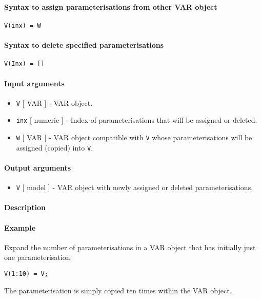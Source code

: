 


	\paragraph{Syntax to assign parameterisations from other VAR
object}\label{syntax-to-assign-parameterisations-from-other-var-object}

\begin{verbatim}
V(inx) = W
\end{verbatim}

\paragraph{Syntax to delete specified
parameterisations}\label{syntax-to-delete-specified-parameterisations}

\begin{verbatim}
V(Inx) = []
\end{verbatim}

\paragraph{Input arguments}\label{input-arguments}

\begin{itemize}
\item
  \texttt{V} {[} VAR {]} - VAR object.
\item
  \texttt{inx} {[} numeric {]} - Index of parameterisations that will be
  assigned or deleted.
\item
  \texttt{W} {[} VAR {]} - VAR object compatible with \texttt{V} whose
  parameterisations will be assigned (copied) into \texttt{V}.
\end{itemize}

\paragraph{Output arguments}\label{output-arguments}

\begin{itemize}
\itemsep1pt\parskip0pt
\item
  \texttt{V} {[} model {]} - VAR object with newly assigned or deleted
  parameterisations,
\end{itemize}

\paragraph{Description}\label{description}

\paragraph{Example}\label{example}

Expand the number of parameterisations in a VAR object that has
initially just one parameterisation:

\begin{verbatim}
V(1:10) = V;
\end{verbatim}

The parameterisation is simply copied ten times within the VAR object.


